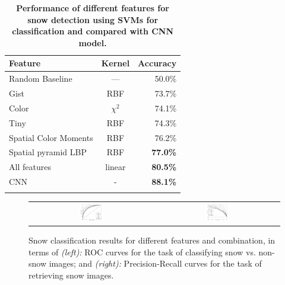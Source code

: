 \vspace{-12pt}
\begin{table}[th!]\centering
\caption{\textbf{Performance of different features for snow detection using SVMs for classification and compared with CNN model.}}
\label{tab:snow}
\tiny
\begin{tabular}{@{}lcr@{}}\toprule
Feature & Kernel & Accuracy\\\midrule
Random Baseline & --- & 50.0\%\\
Gist & RBF & 73.7\%\\
Color  & $\chi^2$ & 74.1\%\\
Tiny & RBF & 74.3\%\\
Spatial Color Moments & RBF & 76.2\%\\
Spatial pyramid LBP & RBF &\textbf{77.0\%}\\\midrule
All features  & linear & \textbf{80.5\%}\\
CNN& -& \textbf{88.1\%}\\
\bottomrule\\
\end{tabular}
\vspace{-8pt}
\end{table}


\begin{figure}[th!]
\begin{center}
\vspace{-8pt}
\begin{tabular}{cc}
 \includegraphics[width=0.2\textwidth]{figure/ROC-CNN-curves.jpg} &
\includegraphics[width=0.2\textwidth]{figure/PR-CNN-curves.jpg} \\
\end{tabular}
\end{center}
\vspace{-24pt}
\caption{
Snow classification results for different features and combination, in terms of {\textit{(left):}} ROC curves for the task of classifying snow vs. non-snow images; and 
{\textit{(right):}} Precision-Recall curves for the task of retrieving snow images.
}
\label{fig:PR_ROC_snow}
\vspace{-8pt}
\end{figure}


